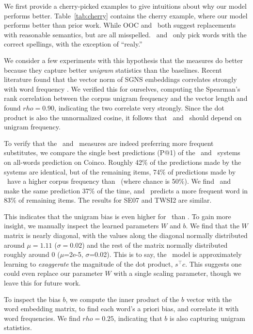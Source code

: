 \documentclass[12pt]{article}
\begin{document}
We first provide a cherry-picked examples to give intuitions about why
our model performs better. Table~\ref{tab:cherry} contains the cherry example,
where our model performs better than prior work. While OOC
and \balAddCos~both suggest replacements with reasonable semantics, but are
all misspelled. \ourmeas~and \ourmeasparam~only pick words with the correct spellings,
with the exception of ``realy.''

We consider a few experiments with this hypothesis that the measures do better
because they capture better {\em unigram} statistics than the baselines. Recent literature found that the vector
norm of SGNS embeddings correlates strongly with word frequency
\cite{wilson:2015:arxiv}. We verified this for ourselves, computing the Spearman's
rank correlation between the corpus unigram frequency and the vector length
and found $rho = 0.90$, indicating the two correlate very strongly. Since the
dot product is also the unnormalized cosine, it follows that \ourmeas~and
\ourmeasparam~should depend on unigram frequency.

To verify that the \ourmeas~and \ourmeasparam~measures are indeed preferring more frequent
substitutes, we compare the single best predictions (P@1) of the \balAddCos~and
\ourmeas~systems on all-words prediction on Coinco. Roughly 42\% of the predictions made
by the systems are identical, but of the remaining items, 74\% of
predictions made by \ourmeas~have a higher corpus frequency than \balAddCos~(where
chance is 50\%). We find \balAddCos~and \ourmeasparam~
make the same prediction 37\% of the time, and \ourmeasparam~predicts a
more frequent word in 83\% of remaining items. The results for SE07 and
TWSI2 are similar.

This indicates that the unigram bias is even higher for \ourmeasparam~than
\ourmeas. To gain more insight, we manually inspect the learned parameters $W$
and $b$. We find that the $W$ matrix is nearly diagonal, with the values along
the diagonal normally distributed around $\mu=1.11$ ($\sigma=0.02$) and the rest
of the matrix normally distributed roughly around 0 ($\mu$=2e-5, $\sigma$=0.02). This
is to say, the \ourmeasparam~model is approximately learning to {\em exaggerate} the
magnitude of the dot product, $s^\top c$. This suggests one could even replace our
parameter $W$ with a single scaling parameter, though we leave this
for future work.

To inspect the bias $b$, we compute the inner product of the $b$ vector with
the word embedding matrix, to find each word's a priori bias, and correlate it with word frequencies. We find
$rho=0.25$, indicating that $b$ is also capturing unigram
statistics.
\end{document}
